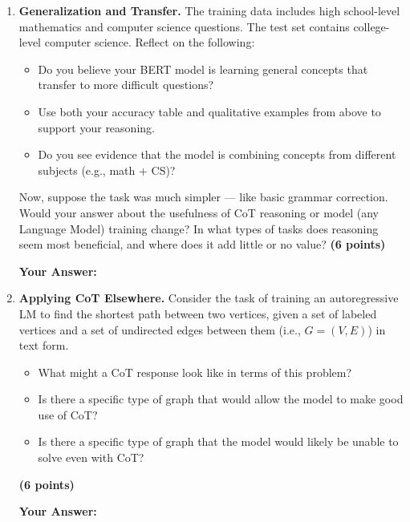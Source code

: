 \documentclass[11pt]{article}
\begin{document}
\begin{enumerate}[label=\textbf{\arabic*.}]
\item \textbf{Generalization and Transfer.}  
The training data includes high school-level mathematics and computer science questions. The test set contains college-level computer science. Reflect on the following:

\begin{itemize}
    \item Do you believe your BERT model is learning general concepts that transfer to more difficult questions?
    \item Use both your accuracy table and qualitative examples from above to support your reasoning.
    \item Do you see evidence that the model is combining concepts from different subjects (e.g., math + CS)?
\end{itemize}

Now, suppose the task was much simpler — like basic grammar correction.  
Would your answer about the usefulness of CoT reasoning or model (any Language Model) training change?
In what types of tasks does reasoning seem most beneficial, and where does it add little or no value? \textbf{(6 points)}

\textbf{Your Answer:}
\begin{framed}
\vspace{32em}
\end{framed}

\item \textbf{Applying CoT Elsewhere.}  
Consider the task of training an autoregressive LM to find the shortest path between two vertices, given a set of labeled vertices and a set of undirected edges between them (i.e., $G = (V, E)$) in text form.  
\begin{itemize}
    \item What might a CoT response look like in terms of this problem?
    \item Is there a specific type of graph that would allow the model to make good use of CoT?
    \item Is there a specific type of graph that the model would likely be unable to solve even with CoT?
\end{itemize}
\textbf{(6 points)}

\newpage
\textbf{Your Answer:}
\begin{framed}
\vspace{32em}
\end{framed}


\end{enumerate}
\end{document}
